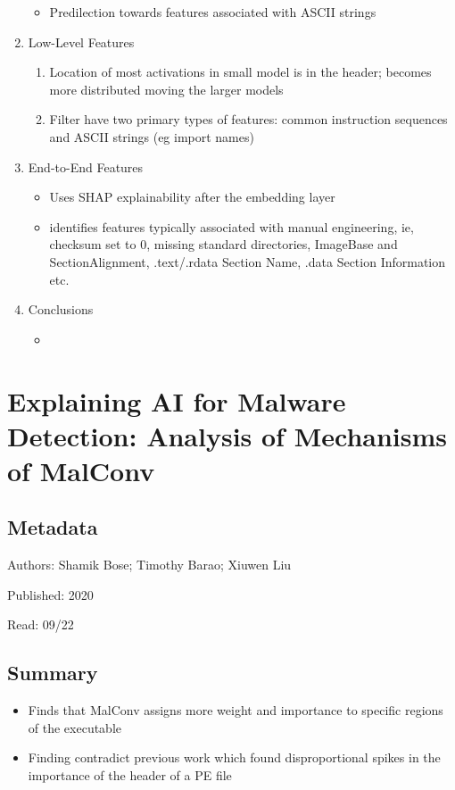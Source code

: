 \documentclass{article}
\begin{document}
\begin{enumerate}
\begin{itemize}
		\item Predilection towards features associated with ASCII strings
	\end{itemize}
	\item Low-Level Features
	\begin{enumerate}
		\item Location of most activations in small model is in the header; becomes more distributed moving the larger models
		\item Filter have two primary types of features: common instruction sequences and ASCII strings (eg import names)
	\end{enumerate}
	\item End-to-End Features
	\begin{itemize}
		\item Uses SHAP explainability after the embedding layer
		\item identifies features typically associated with manual engineering, ie, checksum set to 0, missing standard directories, ImageBase and SectionAlignment, .text/.rdata Section Name, .data Section Information etc.
	\end{itemize}
	\item Conclusions
	\begin{itemize}
		\item 
	\end{itemize}
\end{enumerate}

\pagebreak


\section*{Explaining AI for Malware Detection: Analysis of Mechanisms of MalConv}

\subsection*{Metadata}

\noindent Authors: Shamik Bose; Timothy Barao; Xiuwen Liu

\noindent Published: 2020

\noindent Read: 09/22

\subsection*{Summary}
\begin{itemize}
	\item Finds that MalConv assigns more weight and importance to specific regions of the executable
	\item Finding contradict previous work which found disproportional spikes in the importance of the header of a PE file
\end{itemize}
\end{document}
